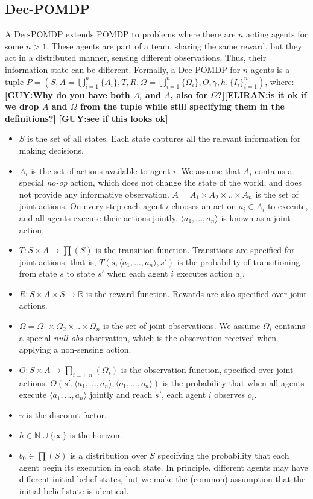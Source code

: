 \documentclass[letterpaper]{article} %
\newcommand{\eliran}[1]{\textbf{[\color{red}ELIRAN:#1]}}
\newcommand{\guy}[1]{\textbf{[\color{orange}GUY:#1]}}
\begin{document}
\subsection{Dec-POMDP}

A Dec-POMDP extends POMDP to problems where there are $n$ acting agents for some $n>1$. 
These agents are part of a team, sharing the same reward, but they act in a distributed manner,
sensing different observations. Thus, their information state can be different. 
Formally, a Dec-POMDP for $n$ agents is a tuple  $P=(S, A=\bigcup_{i=1}^{n}{\{A_i\}}, T, R, \Omega=\bigcup_{i=1}^{n}{\{\Omega_i\}},  O, \gamma, h, {\{I_i\}}_{i=1}^{n})$, where: \guy{Why do you have both $A_i$ and $A$, also for $\Omega$?}\eliran{is it ok if we drop $A$ and $\Omega$ from the tuple while still specifying them in the definitions?} \guy{see if this looks ok}
\begin{itemize}
\item
$S$ is the set of all states. Each state captures all the relevant information for making decisions. 
\item
$A_i$ is the set of actions available to agent $i$. We assume that $A_i$ contains a special {\em no-op} action, which does not change the state of the world, and does not provide any informative observation.
$A=A_1 \times A_2 \times .. \times A_n$ is the set of joint actions. On every step each agent $i$ chooses an action $a_i \in A_i$ to execute, and all agents execute their actions jointly. $\langle a_1,...,a_n \rangle$ is known as a joint action.
\item
$T:S \times A \rightarrow \prod(S)$  is the transition function. Transitions are specified for joint actions, that is, $T(s, \langle a_1,...,a_n \rangle, s')$ is the probability of transitioning from state $s$ to state $s'$ when each agent $i$ executes action $a_i$.
\item
$R:S \times A \times S \rightarrow \mathbb{R}$  is the reward function. Rewards are also specified over joint actions.
\item
$\Omega = \Omega_1 \times \Omega_2 \times .. \times \Omega_n$ is the set of joint observations. We assume $\Omega_i$ contains a special {\em null-obs} observation, which is the observation received when applying a non-sensing action.
\item
$O:S \times A \rightarrow \prod_{i=1..n}(\Omega_i)$  is the observation function, specified over joint actions. $O(s',\langle a_1,...,a_n \rangle,\langle o_1,...,o_n \rangle)$ is the probability that when all agents execute $\langle a_1,...,a_n \rangle$ jointly and reach $s'$, each agent $i$ observes $o_i$.
\item
$\gamma$  is the discount factor.
\item
$h\in\mathbb{N}\cup\{\infty\}$ is the horizon.
\item
$b_0 \in \prod(S)$ is a distribution over $S$ specifying the probability that each agent begin its execution in each state. In principle, different agents may have different initial belief states, but
we make the (common) assumption that the initial belief state is identical. 
\end{itemize}
\end{document}
